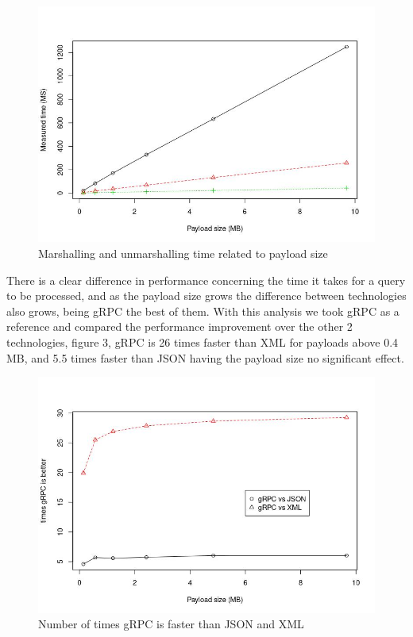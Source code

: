 \documentclass{article}
\begin{document}
\begin{figure}[H]
 \centering
 \includegraphics[scale=0.34]{totalTime.jpeg}
 \caption{Marshalling and unmarshalling time related to payload size}
\end{figure}

\qquad There is a clear difference in performance concerning the time it takes for a query to be processed, and as the payload size grows the difference between technologies also grows, being \ac{gRPC} the best of them. With this analysis we took gRPC as a reference and compared the performance improvement over the other 2 technologies, figure 3, \ac{gRPC} is 26 times faster than XML for payloads above 0.4 MB, and 5.5 times faster than JSON having the payload size no significant effect.

\begin{figure}[H]
 \centering
 \includegraphics[scale=0.33]{gRpcVSTime.jpeg}
 \caption{Number of times gRPC is faster than JSON and XML}
\end{figure}
\end{document}
